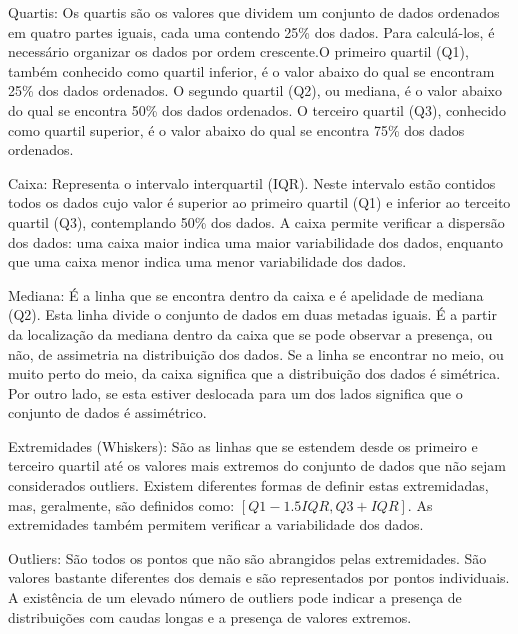 \begin{my_itemize}
	
	\item Quartis: Os quartis são os valores que dividem um conjunto de dados ordenados em quatro partes iguais, cada uma contendo 25\% dos dados. Para calculá-los, é necessário organizar os dados por ordem crescente.O primeiro quartil (Q1), também conhecido como quartil inferior, é o valor abaixo do qual se encontram 25\% dos dados ordenados. O segundo quartil (Q2), ou mediana, é o valor abaixo do qual se encontra 50\% dos dados ordenados. O terceiro quartil (Q3), conhecido como quartil superior, é o valor abaixo do qual se encontra 75\% dos dados ordenados.
	
	\item Caixa: Representa o intervalo interquartil (IQR). Neste intervalo estão contidos  todos os dados cujo valor é superior ao primeiro quartil (Q1) e inferior ao terceito quartil (Q3), contemplando 50\% dos dados. A caixa permite verificar a dispersão dos dados: uma caixa maior indica uma maior variabilidade dos dados, enquanto que uma caixa menor indica uma menor variabilidade dos dados. 
	
	\item Mediana: É a linha que se encontra dentro da caixa e é apelidade de mediana (Q2). Esta linha divide o conjunto de dados em duas metadas iguais. É a partir da localização da mediana dentro da caixa que se pode observar a presença, ou não, de assimetria na distribuição dos dados. Se a linha se encontrar no meio, ou muito perto do meio, da caixa significa que a distribuição dos dados é simétrica. Por outro lado, se esta estiver deslocada para um dos lados significa que o conjunto de dados é assimétrico. 
	
	\item Extremidades (Whiskers): São as linhas que se estendem desde os primeiro e terceiro quartil até os valores mais extremos do conjunto de dados que não sejam considerados outliers. Existem diferentes formas de definir estas extremidadas\cite{spe},  mas, geralmente, são definidos como: $[Q1 - 1.5IQR, Q3 + IQR]$. As extremidades também permitem verificar a variabilidade dos dados. 
	
	\item Outliers: São todos os pontos que não são abrangidos pelas extremidades. São valores bastante diferentes dos demais e são representados por pontos individuais. A existência de um elevado número de outliers pode indicar a presença de distribuições com caudas longas e a presença de valores extremos.
	
\end{my_itemize}


